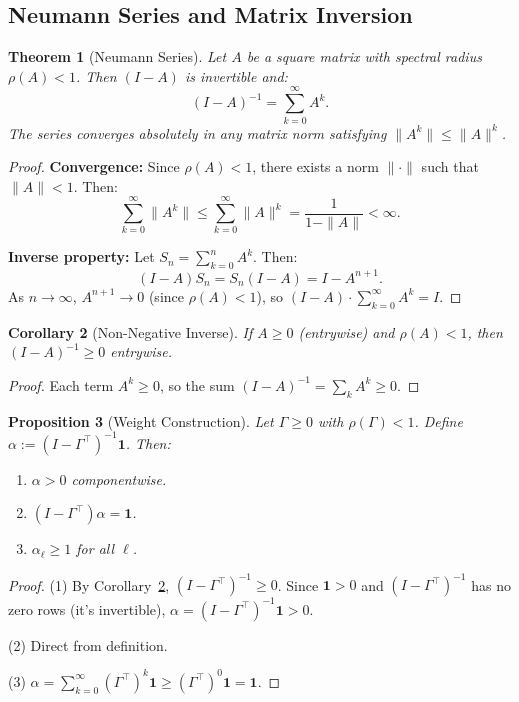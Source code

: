\documentclass[12pt]{article}
\newtheorem{theorem}{Theorem}[section]
\newtheorem{proposition}[theorem]{Proposition}
\newtheorem{corollary}[theorem]{Corollary}
\begin{document}
\subsection{Neumann Series and Matrix Inversion}

\begin{theorem}[Neumann Series]
\label{thm:neumann}
Let $A$ be a square matrix with spectral radius $\rho(A) < 1$. Then $(I - A)$ is invertible and:
\[
(I - A)^{-1} = \sum_{k=0}^\infty A^k.
\]
The series converges absolutely in any matrix norm satisfying $\|A^k\| \leq \|A\|^k$.
\end{theorem}

\begin{proof}
\textbf{Convergence:} Since $\rho(A) < 1$, there exists a norm $\|\cdot\|$ such that $\|A\| < 1$. Then:
\[
\sum_{k=0}^\infty \|A^k\| \leq \sum_{k=0}^\infty \|A\|^k = \frac{1}{1 - \|A\|} < \infty.
\]

\textbf{Inverse property:} Let $S_n = \sum_{k=0}^n A^k$. Then:
\[
(I - A) S_n = S_n (I - A) = I - A^{n+1}.
\]
As $n \to \infty$, $A^{n+1} \to 0$ (since $\rho(A) < 1$), so $(I - A) \cdot \sum_{k=0}^\infty A^k = I$.
\end{proof}

\begin{corollary}[Non-Negative Inverse]
\label{cor:nonneg-inverse}
If $A \geq 0$ (entrywise) and $\rho(A) < 1$, then $(I - A)^{-1} \geq 0$ entrywise.
\end{corollary}

\begin{proof}
Each term $A^k \geq 0$, so the sum $(I - A)^{-1} = \sum_k A^k \geq 0$.
\end{proof}

\begin{proposition}[Weight Construction]
\label{prop:weight-construction}
Let $\Gamma \geq 0$ with $\rho(\Gamma) < 1$. Define $\alpha := (I - \Gamma^\top)^{-1} \mathbf{1}$. Then:
\begin{enumerate}
    \item $\alpha > 0$ componentwise.
    \item $(I - \Gamma^\top) \alpha = \mathbf{1}$.
    \item $\alpha_\ell \geq 1$ for all $\ell$.
\end{enumerate}
\end{proposition}

\begin{proof}
(1) By Corollary~\ref{cor:nonneg-inverse}, $(I - \Gamma^\top)^{-1} \geq 0$. Since $\mathbf{1} > 0$ and $(I - \Gamma^\top)^{-1}$ has no zero rows (it's invertible), $\alpha = (I - \Gamma^\top)^{-1} \mathbf{1} > 0$.

(2) Direct from definition.

(3) $\alpha = \sum_{k=0}^\infty (\Gamma^\top)^k \mathbf{1} \geq (\Gamma^\top)^0 \mathbf{1} = \mathbf{1}$.
\end{proof}
\end{document}
